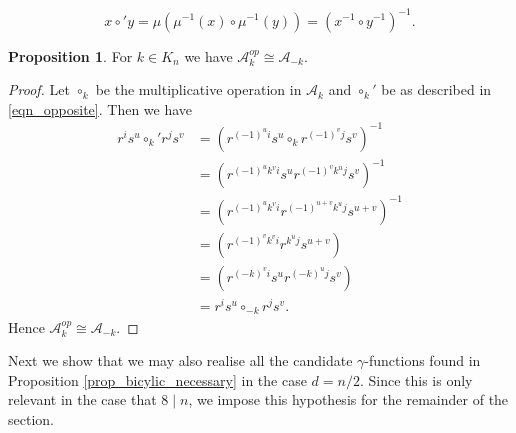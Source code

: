 \documentclass[reqno]{amsart}
\theoremstyle{definition}
\newtheorem{proposition}[theorem]{Proposition}
\begin{document}
\begin{equation} \label{eqn_opposite}
x \circ' y = \mu( \mu^{-1}(x) \circ \mu^{-1}(y)) = (x^{-1} \circ y^{-1})^{-1}. 
\end{equation}

\begin{proposition} \label{prop_A_k_opposite}
For $ k \in K_{n} $ we have $ \mathscr{A}_{k}^{op} \cong \mathscr{A}_{-k} $.  
\end{proposition}
\begin{proof}
Let $ \circ_{k} $ be the multiplicative operation in $ \mathscr{A}_{k} $ and 
$ \circ_{k}' $ be as described in \eqref{eqn_opposite}. Then we have
\begin{align*}
r^{i}s^{u} \circ_{k}' r^{j}s^{v} &= \left( r^{(-1)^{u}i}s^{u} \circ_{k} r^{(-1)^{v}j}s^{v} \right)^{-1} \\
&= \left( r^{(-1)^{u}k^{v}i}s^{u} r^{(-1)^{v}k^{u}j}s^{v} \right)^{-1} \\
&= \left( r^{(-1)^{u}k^{v}i}r^{(-1)^{u+v}k^{u}j}s^{u+v} \right)^{-1} \\
&= \left( r^{(-1)^{v}k^{v}i}r^{k^{u}j}s^{u+v} \right) \\
&= \left( r^{(-k)^{v}i}s^{u} r^{(-k)^{u}j}s^{v} \right) \\
&= r^{i}s^{u} \circ_{-k} r^{j}s^{v}.
\end{align*}
Hence $ \mathscr{A}_{k}^{op} \cong \mathscr{A}_{-k} $.
\end{proof}

Next we show that we may also realise all the candidate $ \gamma $-functions found in Proposition \ref{prop_bicylic_necessary} in the case $ d=n/2 $. Since this is only relevant in the case that $ 8 \mid n $, we impose this hypothesis for the remainder of the section. 
\end{document}
